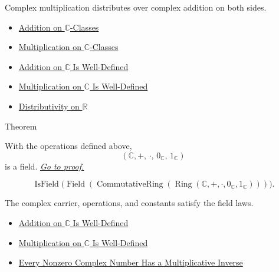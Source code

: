 \begin{remark*}[Interpretation]
Complex multiplication distributes over complex addition on both sides.
\end{remark*}

\begin{dependencies}
\begin{itemize}
  \item \hyperref[def:addition-on-c-classes]{Addition on $\mathbb{C}$-Classes}
  \item \hyperref[def:multiplication-on-c-classes]{Multiplication on $\mathbb{C}$-Classes}
  \item \hyperref[thm:addition-on-c-well-defined]{Addition on $\mathbb{C}$ Is Well-Defined}
  \item \hyperref[thm:multiplication-on-c-well-defined]{Multiplication on $\mathbb{C}$ Is Well-Defined}
  \item \hyperref[thm:distributivity-on-r]{Distributivity on $\mathbb{R}$}
\end{itemize}
\end{dependencies}

\begin{theorembox}{Theorem}
\begin{theorem}
\label{thm:c-is-a-field}
With the operations defined above,
\[
(\mathbb{C},+,\,\cdot,\,0_{\mathbb{C}},\,1_{\mathbb{C}})
\]
is a field.
\hyperref[prf:c-is-a-field]{\textit{Go to proof.}}
\end{theorem}
\end{theorembox}


\begin{remark*}
\[
\operatorname{IsField}
\bigl(\operatorname{Field}(
\operatorname{CommutativeRing}(\operatorname{Ring}(
\mathbb{C},+,\cdot,0_{\mathbb{C}},1_{\mathbb{C}})))\bigr).
\]
\end{remark*}

\begin{remark*}[Interpretation]
The complex carrier, operations, and constants satisfy the field laws.
\end{remark*}

\begin{dependencies}
\begin{itemize}
  \item \hyperref[thm:addition-on-c-well-defined]{Addition on $\mathbb{C}$ Is Well-Defined}
  \item \hyperref[thm:multiplication-on-c-well-defined]{Multiplication on $\mathbb{C}$ Is Well-Defined}
  \item \hyperref[thm:every-nonzero-complex-has-inverse]{Every Nonzero Complex Number Has a Multiplicative Inverse}
\end{itemize}
\end{dependencies}

